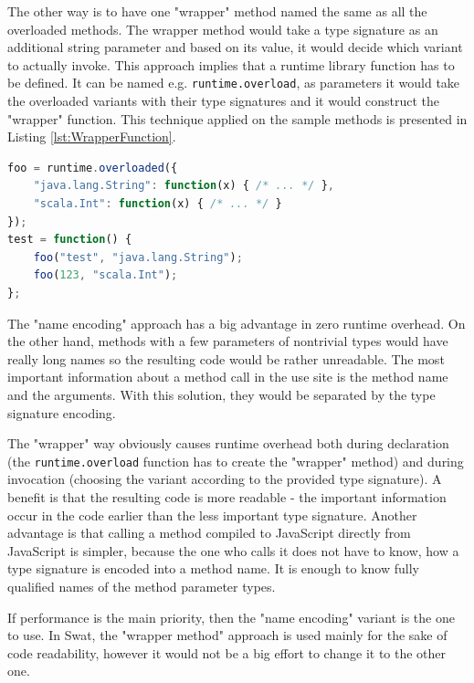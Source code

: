 \documentclass[12pt,a4paper]{report}
\begin{document}
The other way is to have one "wrapper" method named the same as all the overloaded methods. The wrapper method would take a type signature as an additional string parameter and based on its value, it would decide which variant to actually invoke. This approach implies that a runtime library function has to be defined. It can be named e.g. \texttt{runtime.overload}, as parameters it would take the overloaded variants with their type signatures and it would construct the "wrapper" function. This technique applied on the sample methods is presented in Listing \ref{lst:WrapperFunction}.

\begin{minipage}{\linewidth}
\begin{lstlisting}[language=JavaScript,caption={Overloading in JavaScript.},label={lst:WrapperFunction}]
foo = runtime.overloaded({
	"java.lang.String": function(x) { /* ... */ },
	"scala.Int": function(x) { /* ... */ }
});
test = function() {
	foo("test", "java.lang.String");
	foo(123, "scala.Int");
};
\end{lstlisting}
\end{minipage}

The "name encoding" approach has a big advantage in zero runtime overhead. On the other hand, methods with a few parameters of nontrivial types would have really long names so the resulting code would be rather unreadable. The most important information about a method call in the use site is the method name and the arguments. With this solution, they would be separated by the type signature encoding.

The "wrapper" way obviously causes runtime overhead both during declaration (the \texttt{runtime.overload} function has to create the "wrapper" method) and during invocation (choosing the variant according to the provided type signature). A benefit is that the resulting code is more readable - the important information occur in the code earlier than the less important type signature. Another advantage is that calling a method compiled to JavaScript directly from JavaScript is simpler, because the one who calls it does not have to know, how a type signature is encoded into a method name. It is enough to know fully qualified names of the method parameter types.

If performance is the main priority, then the "name encoding" variant is the one to use. In Swat, the "wrapper method" approach is used mainly for the sake of code readability, however it would not be a big effort to change it to the other one.
\end{document}
